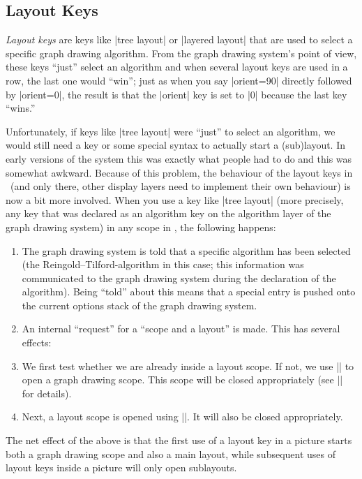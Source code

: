 \subsection{Layout Keys}

\emph{Layout keys} are keys like |tree layout|
or |layered layout| that are used to select a specific graph drawing
algorithm. From the graph drawing system's point of view, these keys
``just'' select an algorithm and when several layout keys are used in
a row, the last one would ``win''; just as when you say |orient=90| directly
followed by |orient=0|, the result is that the |orient| key is set to
|0| because the last key ``wins.''

Unfortunately, if keys like |tree layout| were ``just'' to select an
algorithm, we would still need a key or some special syntax to
actually start a (sub)layout. In early versions of the system this was
exactly what people had to do and this was somewhat awkward. Because
of this problem, the behaviour of the layout keys in \pgfname\ (and
only there, other display layers need to implement their own
behaviour) is now a bit more involved. When you use a key like
|tree layout| (more precisely, any key that
was declared as an algorithm key on the algorithm layer of the graph
drawing system) in any scope in \pgfname, the following happens: 
\begin{enumerate}
\item The graph drawing system is told that a specific algorithm has
  been selected (the Reingold--Tilford-algorithm in this case; this
  information was communicated to the graph drawing system during the
  declaration of the algorithm). Being ``told'' about this means that
  a special entry is pushed onto the current options stack of the
  graph drawing system. 
\item An internal ``request'' for a ``scope and a layout'' is
  made. This has several effects:
\item
  We first test whether we are already inside a layout scope. If not,
  we use |\pgfgdbeginscope| to open a graph drawing scope. This 
  scope will be closed appropriately (see |\pgfgdsetrequestcallback|
  for details).
\item
  Next, a layout scope is opened using |\pgfgdbeginlayout|.  It will
  also be closed appropriately.
\end{enumerate}

The net effect of the above is that the first use of a layout key in a
picture starts both a graph drawing scope and also a main layout,
while subsequent uses of layout keys inside a picture will only open
sublayouts.

